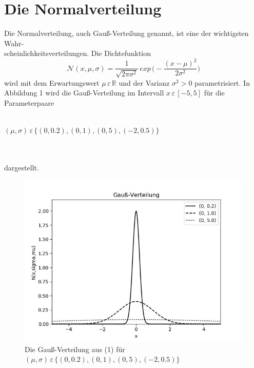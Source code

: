 \documentclass[a4paper,12pt]{scrartcl}
\begin{document}
\section{Die Normalverteilung}
Die Normalverteilung, auch Gauß-Verteilung genannt, ist eine der wichtigsten Wahr-\\
scheinlichkeitsverteilungen. Die Dichtefunktion
\begin{equation}
\mathcal{N}(x,\mu,\sigma) = \frac{1}{\sqrt{2\pi\sigma^{2}}} \,{} exp \,{} \bigg(-\frac{(x-\mu)^{2}}{2\sigma^{2}}\bigg)
\end{equation}
wird mit dem Erwartungswert $\mu \,{} \varepsilon \,{} \mathbb{R}$ und der Varianz $\sigma^{2} > 0$ parametrisiert. In\\
Abbildung 1 wird die Gauß-Verteilung im Intervall $x \,{} \varepsilon \,{} [-5,5]$ für die Parameterpaare\\\\
\centerline{$(\mu,\sigma) \,{} \varepsilon \,{} \{(0,0.2),(0,1),(0,5),(-2,0.5)\}$}\\\\
dargestellt.
\begin{figure}[h]
\begin{center}
\includegraphics[width=12cm]{GV.jpg}
\caption{Die Gauß-Verteilung aus (1) für $(\mu,\sigma) \,{} \varepsilon \,{} \{(0,0.2),(0,1),(0,5),(-2,0.5)\}$}
\label{latex_logo}
\end{center}
\end{figure}
\end{document}
